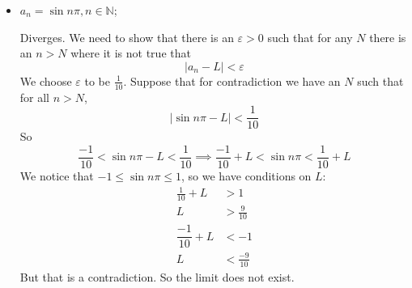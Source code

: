 \documentclass{article}
\begin{document}
\begin{itemize}
        \item $a_{n} = \sin{n\pi}, n \in \mathbb{N}$;
            \begin{answer}
                Diverges. We need to show that there is an $\varepsilon >  0$ such that for any $N$ there is an $n > N$ where it is not true that
                    \begin{equation*}
                        \left\lvert a_{n} - L \right\rvert < \varepsilon
                    \end{equation*}
                We choose $\varepsilon$ to be $\frac{1}{10}$. Suppose that for contradiction we have an $N$ such that for all $n >  N$, 
                    \begin{equation*}
                        \lvert \sin{n\pi} - L \rvert < \frac{1}{10}
                    \end{equation*}
                So 
                    \begin{equation*}
                        \frac{-1}{10} < \sin{n\pi} - L < \frac{1}{10} \implies \frac{-1}{10} + L < \sin{n\pi} <  \frac{1}{10} + L
                    \end{equation*}
                We notice that $-1 \leq \sin{n\pi} \leq 1$, so we have conditions on $L$:
                    \begin{align*}
                        \frac{1}{10} + L   &>               1             \\
                        L                  &> \frac{9}{10}               \\
                        \dfrac{-1}{10} + L &<              -1            \\
                        L                  &<              \frac{-9}{10}   
                    \end{align*}
                But that is a contradiction. So the limit does not exist.
            \end{answer}


\end{itemize}
\end{document}

